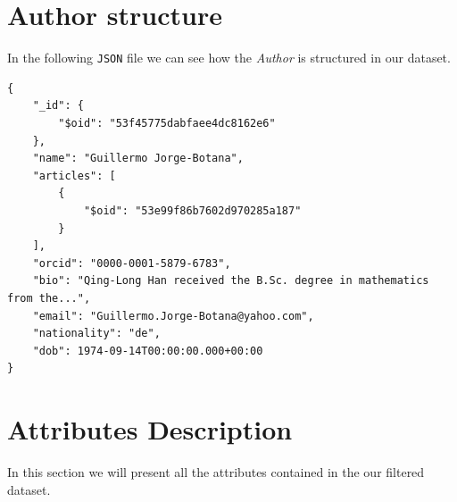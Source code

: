 \documentclass{Configuration_Files/PoliMi3i_thesis}
\begin{document}
\section{Author structure}
In the following \verb |JSON| file we can see how the \emph{Author} is structured in our dataset.\newline
\begin{lstlisting}
{
	"_id": {
		"$oid": "53f45775dabfaee4dc8162e6"
	},
	"name": "Guillermo Jorge-Botana",
	"articles": [
		{
			"$oid": "53e99f86b7602d970285a187"
		}
	],
	"orcid": "0000-0001-5879-6783",
	"bio": "Qing-Long Han received the B.Sc. degree in mathematics from the...",
	"email": "Guillermo.Jorge-Botana@yahoo.com",
	"nationality": "de",
	"dob": 1974-09-14T00:00:00.000+00:00
}
\end{lstlisting}

\newpage
\section{Attributes Description}
In this section we will present all the attributes contained in the our filtered dataset.
\end{document}
